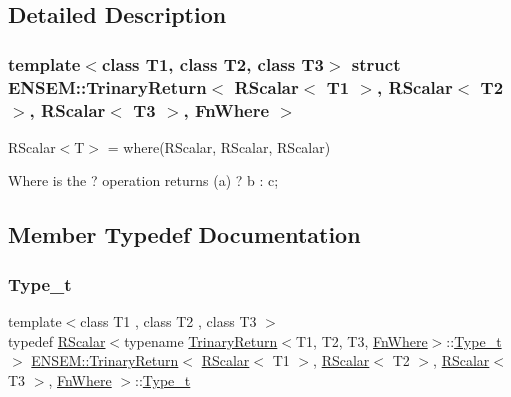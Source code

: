 \subsection{Detailed Description}
\subsubsection*{template$<$class T1, class T2, class T3$>$\newline
struct E\+N\+S\+E\+M\+::\+Trinary\+Return$<$ R\+Scalar$<$ T1 $>$, R\+Scalar$<$ T2 $>$, R\+Scalar$<$ T3 $>$, Fn\+Where $>$}

R\+Scalar$<$\+T$>$ = where(\+R\+Scalar, R\+Scalar, R\+Scalar) 

Where is the ? operation returns (a) ? b \+: c; 

\subsection{Member Typedef Documentation}
\mbox{\label{structENSEM_1_1TrinaryReturn_3_01RScalar_3_01T1_01_4_00_01RScalar_3_01T2_01_4_00_01RScalar_3_01T3_01_4_00_01FnWhere_01_4_ada2fb1fa55073f4129c8b9ecac068790}} 
\subsubsection{\texorpdfstring{Type\_t}{Type\_t}\hspace{0.1cm}{\footnotesize\ttfamily [1/2]}}
{\footnotesize\ttfamily template$<$class T1 , class T2 , class T3 $>$ \\
typedef \mbox{\hyperlink{classENSEM_1_1RScalar}{R\+Scalar}}$<$typename \mbox{\hyperlink{structENSEM_1_1TrinaryReturn}{Trinary\+Return}}$<$T1, T2, T3, \mbox{\hyperlink{structENSEM_1_1FnWhere}{Fn\+Where}}$>$\+::\mbox{\hyperlink{structENSEM_1_1TrinaryReturn_3_01RScalar_3_01T1_01_4_00_01RScalar_3_01T2_01_4_00_01RScalar_3_01T3_01_4_00_01FnWhere_01_4_ada2fb1fa55073f4129c8b9ecac068790}{Type\+\_\+t}}$>$ \mbox{\hyperlink{structENSEM_1_1TrinaryReturn}{E\+N\+S\+E\+M\+::\+Trinary\+Return}}$<$ \mbox{\hyperlink{classENSEM_1_1RScalar}{R\+Scalar}}$<$ T1 $>$, \mbox{\hyperlink{classENSEM_1_1RScalar}{R\+Scalar}}$<$ T2 $>$, \mbox{\hyperlink{classENSEM_1_1RScalar}{R\+Scalar}}$<$ T3 $>$, \mbox{\hyperlink{structENSEM_1_1FnWhere}{Fn\+Where}} $>$\+::\mbox{\hyperlink{structENSEM_1_1TrinaryReturn_3_01RScalar_3_01T1_01_4_00_01RScalar_3_01T2_01_4_00_01RScalar_3_01T3_01_4_00_01FnWhere_01_4_ada2fb1fa55073f4129c8b9ecac068790}{Type\+\_\+t}}}

